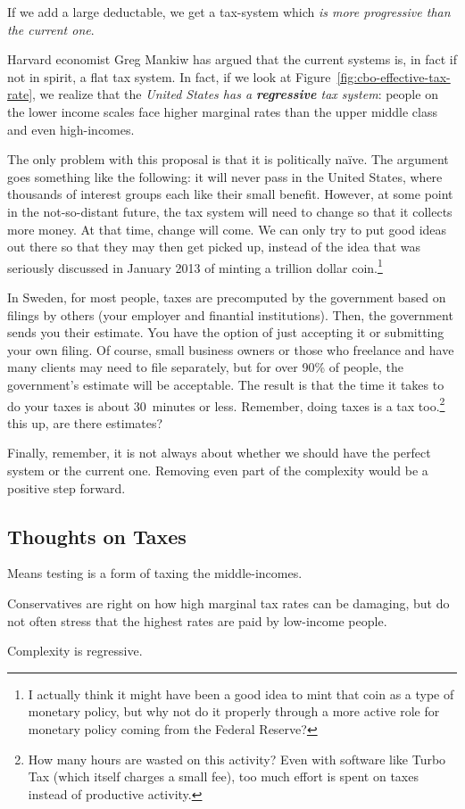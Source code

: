 If we add a large deductable, we get a tax-system which \emph{is more
progressive than the current one}.

Harvard economist Greg Mankiw has argued that the current systems is, in fact
if not in spirit, a flat tax system.
In fact, if we look at Figure~\ref{fig:cbo-effective-tax-rate}, we realize that
the \emph{United States has a \textbf{regressive} tax system}: people on the
lower income scales face higher marginal rates than the upper middle class and
even high-incomes.

The only problem with this proposal is that it is politically naïve. The
argument goes something like the following: it will never pass in the United
States, where thousands of interest groups each like their small benefit.
However, at some point in the not-so-distant future, the tax system will need
to change so that it collects more money. At that time, change will come. We
can only try to put good ideas out there so that they may then get picked up,
instead of the idea that was seriously discussed in January 2013 of minting a
trillion dollar coin.\footnote{I actually think it might have been a good idea
to mint that coin as a type of monetary policy, but why not do it properly
through a more active role for monetary policy coming from the Federal
Reserve?}

In Sweden, for most people, taxes are precomputed by the government based on
filings by others (your employer and finantial institutions). Then, the
government sends you their estimate. You have the option of just accepting it
or submitting your own filing. Of course, small business owners or those who
freelance and have many clients may need to file separately, but for over 90\%
of people, the government's estimate will be acceptable. The result is that the
time it takes to do your taxes is about 30~minutes or less. Remember, doing
taxes is a tax too.\footnote{How many hours are wasted on this activity? Even
with software like Turbo Tax (which itself charges a small fee), too much
effort is spent on taxes instead of productive activity.}%
this up, are there estimates?

Finally, remember, it is not always about whether we should have the perfect
system or the current one. Removing even part of the complexity would be a
positive step forward.

\subsection{Thoughts on Taxes}

\thought Means testing is a form of taxing the middle-incomes.

\thought Conservatives are right on how high marginal tax rates can be
damaging, but do not often stress that the highest rates are paid by low-income
people.

\thought Complexity is regressive.

